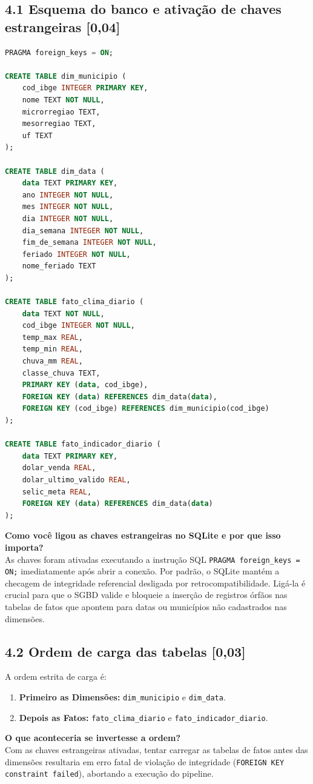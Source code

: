 \documentclass[11pt,a4paper]{article}
\begin{document}
\subsection*{4.1 Esquema do banco e ativação de chaves estrangeiras \textnormal{[0,04]}}

\begin{lstlisting}[language=SQL]
PRAGMA foreign_keys = ON;

CREATE TABLE dim_municipio (
    cod_ibge INTEGER PRIMARY KEY,
    nome TEXT NOT NULL,
    microrregiao TEXT,
    mesorregiao TEXT,
    uf TEXT
);

CREATE TABLE dim_data (
    data TEXT PRIMARY KEY,
    ano INTEGER NOT NULL,
    mes INTEGER NOT NULL,
    dia INTEGER NOT NULL,
    dia_semana INTEGER NOT NULL,
    fim_de_semana INTEGER NOT NULL,
    feriado INTEGER NOT NULL,
    nome_feriado TEXT
);

CREATE TABLE fato_clima_diario (
    data TEXT NOT NULL,
    cod_ibge INTEGER NOT NULL,
    temp_max REAL,
    temp_min REAL,
    chuva_mm REAL,
    classe_chuva TEXT,
    PRIMARY KEY (data, cod_ibge),
    FOREIGN KEY (data) REFERENCES dim_data(data),
    FOREIGN KEY (cod_ibge) REFERENCES dim_municipio(cod_ibge)
);

CREATE TABLE fato_indicador_diario (
    data TEXT PRIMARY KEY,
    dolar_venda REAL,
    dolar_ultimo_valido REAL,
    selic_meta REAL,
    FOREIGN KEY (data) REFERENCES dim_data(data)
);
\end{lstlisting}

\noindent\textbf{Como você ligou as chaves estrangeiras no SQLite e por que isso importa?}\\
As chaves foram ativadas executando a instrução SQL \texttt{PRAGMA foreign\_keys = ON;} imediatamente após abrir a conexão. Por padrão, o SQLite mantém a checagem de integridade referencial desligada por retrocompatibilidade. Ligá-la é crucial para que o SGBD valide e bloqueie a inserção de registros órfãos nas tabelas de fatos que apontem para datas ou municípios não cadastrados nas dimensões.

\subsection*{4.2 Ordem de carga das tabelas \textnormal{[0,03]}}
A ordem estrita de carga é:
\begin{enumerate}
    \item \textbf{Primeiro as Dimensões:} \texttt{dim\_municipio} e \texttt{dim\_data}.
    \item \textbf{Depois as Fatos:} \texttt{fato\_clima\_diario} e \texttt{fato\_indicador\_diario}.
\end{enumerate}
\textbf{O que aconteceria se invertesse a ordem?}\\
Com as chaves estrangeiras ativadas, tentar carregar as tabelas de fatos antes das dimensões resultaria em erro fatal de violação de integridade (\texttt{FOREIGN KEY constraint failed}), abortando a execução do pipeline.
\end{document}
